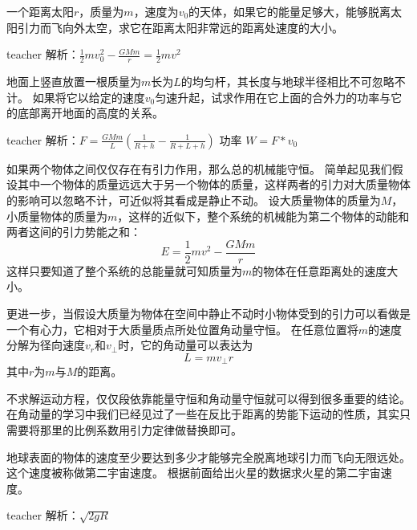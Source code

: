 \begin{example}
一个距离太阳$r$，质量为$m$，速度为$v_0$的天体，如果它的能量足够大，能够脱离太阳引力而飞向外太空，求它在距离太阳非常远的距离处速度的大小。
\begin{taggedblock}{teacher}
\newline
解析：$\frac{1}{2}mv_0^2-\frac{GMm}{r}=\frac{1}{2}mv^2$
\end{taggedblock}
\end{example}

\begin{example}
地面上竖直放置一根质量为$m$长为$L$的均匀杆，其长度与地球半径相比不可忽略不计。
如果将它以给定的速度$v_0$匀速升起，试求作用在它上面的合外力的功率与它的底部离开地面的高度的关系。
\begin{taggedblock}{teacher}
\newline
解析：$F=\frac{GMm}{L}(\frac{1}{R+h}-\frac{1}{R+L+h})$
功率 $W=F*v_0$
\end{taggedblock}
\end{example}

如果两个物体之间仅仅存在有引力作用，那么总的机械能守恒。
简单起见我们假设其中一个物体的质量远远大于另一个物体的质量，这样两者的引力对大质量物体的影响可以忽略不计，可近似将其看成是静止不动。
设大质量物体的质量为$M$，小质量物体的质量为$m$，这样的近似下，整个系统的机械能为第二个物体的动能和两者这间的引力势能之和：
\begin{equation}
E = \frac{1}{2}mv^2-\frac{GMm}{r}
\end{equation}
这样只要知道了整个系统的总能量就可知质量为$m$的物体在任意距离处的速度大小。

更进一步，当假设大质量为物体在空间中静止不动时小物体受到的引力可以看做是一个有心力，它相对于大质量质点所处位置角动量守恒。
在任意位置将$m$的速度分解为径向速度$v_r$和$v_\perp$时，它的角动量可以表达为
\begin{equation}
L = mv_\perp r
\end{equation}
其中$r$为$m$与$M$的距离。

不求解运动方程，仅仅段依靠能量守恒和角动量守恒就可以得到很多重要的结论。
在角动量的学习中我们已经见过了一些在反比于距离的势能下运动的性质，其实只需要将那里的比例系数用引力定律做替换即可。

\begin{example}
地球表面的物体的速度至少要达到多少才能够完全脱离地球引力而飞向无限远处。
这个速度被称做第二宇宙速度。
根据前面给出火星的数据求火星的第二宇宙速度。
\begin{taggedblock}{teacher}
\newline
解析：$\sqrt{2gR}$
\end{taggedblock}
\end{example}


